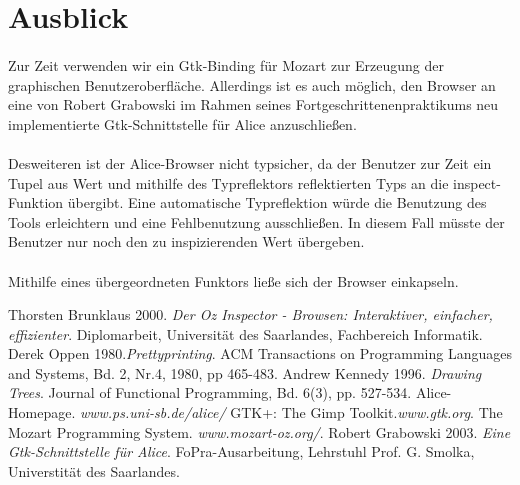 \documentclass[12pt,a4paper]{article}
\begin{document}

\section{Ausblick}

\paragraph{}

Zur Zeit verwenden wir ein Gtk-Binding f\"ur Mozart \cite{mo:mo}
zur Erzeugung der graphischen Benutzeroberfl\"ache. Allerdings ist 
es auch m\"oglich, den Browser an eine von Robert Grabowski im Rahmen 
seines Fortgeschrittenenpraktikums neu implementierte Gtk-Schnittstelle
f\"ur Alice \cite{gr:gt} anzuschlie\ss en.

\paragraph{}

Desweiteren ist der Alice-Browser nicht typsicher, 
da der Benutzer zur Zeit ein Tupel aus 
Wert und mithilfe des Typreflektors reflektierten Typs 
an die inspect-Funktion \"ubergibt.  
Eine automatische Typreflektion w\"urde die Benutzung des Tools 
erleichtern und eine Fehlbenutzung ausschlie\ss en. 
In diesem Fall m\"usste der Benutzer nur noch den zu 
inspizierenden Wert \"ubergeben. 

\paragraph{}

Mithilfe eines \"ubergeordneten Funktors lie\ss e 
sich der Browser einkapseln.



\begin{thebibliography}{99}

 Thorsten Brunklaus 2000. {\em Der Oz Inspector - Browsen: 
    Interaktiver, einfacher, effizienter}. Diplomarbeit, Universit\"at 
    des Saarlandes, Fachbereich Informatik.
 Derek Oppen 1980.{\em Prettyprinting}. ACM Transactions 
  on Programming Languages and Systems, Bd. 2, Nr.4, 1980, pp 465-483.
 Andrew Kennedy 1996. {\em Drawing Trees}. 
                Journal of Functional Programming, Bd. 6(3), pp. 527-534.
 Alice-Homepage. {\em www.ps.uni-sb.de/alice/}
 GTK+: The Gimp Toolkit.{\em www.gtk.org}. 
 The Mozart Programming System. {\em www.mozart-oz.org/}.
 Robert Grabowski 2003. {\em Eine Gtk-Schnittstelle f\"ur 
                Alice}. 
                FoPra-Ausarbeitung, Lehrstuhl Prof. G. Smolka, 
                Universtit\"at des Saarlandes.

\end{thebibliography}
\end{document}
